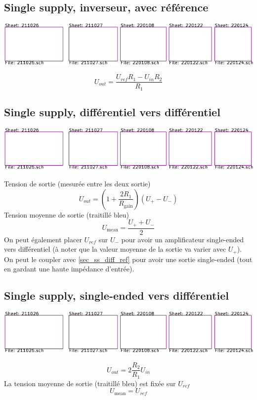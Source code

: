 \documentclass[resume]{subfiles}
\begin{document}
\begin{multicols}{3}
\subsection{Single supply, inverseur, avec référence}
\begin{center}
\includegraphics[scale=1,page=4]{../KiCad/resume-crop.pdf}
\end{center}
$$\boxed{U_{out}=\frac{U_{ref}R_1-U_{in}R_2}{R_1}}$$

\subsection{Single supply, différentiel vers différentiel}
\begin{center}
\includegraphics[scale=1,page=17]{../KiCad/resume-crop.pdf}
\end{center}
Tension de sortie (mesurée entre les deux sortie)
$$\boxed{U_{out}=\left(1+\frac{2R_1}{R_{\text{gain}}}\right)\left(U_{+}-U_{-}\right)}$$
Tension moyenne de sortie (traitillé  bleu)
$$\boxed{U_{\text{mean}}=\frac{U_{+}+U_{-}}{2}}$$
On peut également placer $U_{ref}$ sur $U_{-}$ pour avoir un amplificateur single-ended vers différentiel (à noter que la valeur moyenne de la sortie va varier avec $U_{+}$).\\
On peut le coupler avec \ref{sec_ss_diff_ref} pour avoir une sortie single-ended (tout en gardant une haute impédance d'entrée).
\subsection{Single supply, single-ended vers différentiel}
\begin{center}
\includegraphics[scale=1,page=18]{../KiCad/resume-crop.pdf}
\end{center}
$$\boxed{U_{out}=2\frac{R_2}{R_1}U_{in}}$$
La tension moyenne de sortie (traitillé bleu) est fixée sur $U_{ref}$
$$\boxed{U_{\text{mean}}=U_{ref}}$$

\end{multicols}
\end{document}
